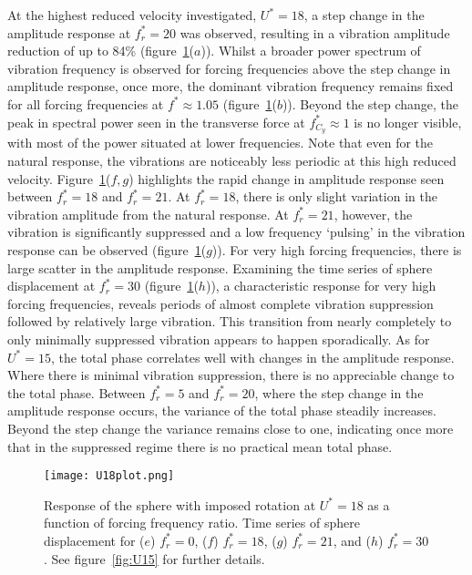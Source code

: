 \documentclass[3p]{elsarticle}
\newcommand{\Ustar}{\ensuremath{U^{*}}}
\newcommand{\fstar}{\ensuremath{f^{*}}}
\newcommand{\freqrat}{\ensuremath{f_r^*}}
\newcommand{\fCy}{\ensuremath{f^*_{C_y}}}
\begin{document}
At the highest reduced velocity investigated, $\Ustar=18$, a step
change in the amplitude response at $\freqrat=20$ was observed,
resulting in a vibration amplitude reduction of up to 84\%
(figure~\ref{fig:U18}($a$)). Whilst a broader power spectrum of
vibration frequency is observed for forcing frequencies above the step
change in amplitude response, once more, the dominant vibration
frequency remains fixed for all forcing frequencies at
$\fstar\approx1.05$ (figure~\ref{fig:U18}($b$)). Beyond the step
change, the peak in spectral power seen in the transverse force at
$\fCy\approx1$ is no longer visible, with most of the power situated
at lower frequencies. Note that even for the natural response, the
vibrations are noticeably less periodic at this high reduced velocity.
Figure~\ref{fig:U18}($f,g$) highlights the rapid change in amplitude
response seen between $\freqrat=18$ and $\freqrat=21$.
At $\freqrat=18$, there is only slight variation in the vibration
amplitude from the natural response. At $\freqrat=21$, however, the
vibration is significantly suppressed and a low frequency `pulsing' in
the vibration response can be observed (figure~\ref{fig:U18}($g$)).
For very high forcing frequencies, there is large scatter in the
amplitude response. Examining the time series of sphere displacement
at $\freqrat=30$ (figure~\ref{fig:U18}($h$)), a characteristic
response for very high forcing frequencies, reveals periods of almost
complete vibration suppression followed by relatively large vibration.
This transition from nearly completely to only minimally suppressed
vibration appears to happen sporadically. As for $\Ustar=15$, the
total phase correlates well with changes in the amplitude response.
Where there is minimal vibration suppression, there is no appreciable
change to the total phase. Between $\freqrat=5$ and $\freqrat=20$,
where the step change in the amplitude response occurs, the variance
of the total phase steadily increases. Beyond the step change the
variance remains close to one, indicating once more that in the
suppressed regime there is no practical mean total phase.
%
\begin{figure}
	\centering
	\texttt{[image: U18plot.png]}
	\caption{Response of the sphere with imposed rotation at
		$\Ustar=18$ as a function of forcing frequency ratio. Time
		series of sphere displacement for ($e$) $\freqrat=0$,
		($f$) $\freqrat=18$, ($g$) $\freqrat=21$, and ($h$)
		$\freqrat=30$. See figure~\ref{fig:U15} for further
		details.}
	\label{fig:U18}
\end{figure}
%
\end{document}
